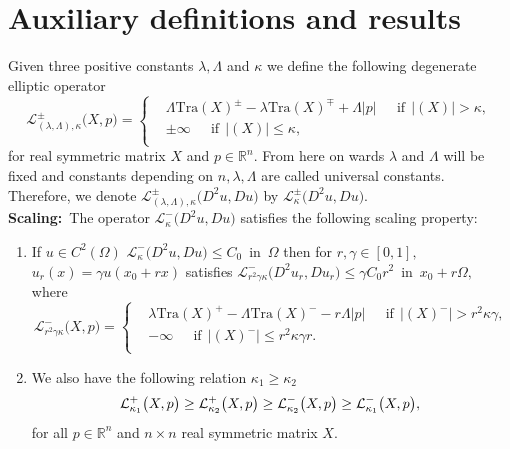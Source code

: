 \documentclass{amsart}
\theoremstyle{plain}
\numberwithin{equation}{section}
\begin{document}
\section{Auxiliary definitions and  results}
Given three positive constants $\lambda,\Lambda$ and $\kappa$ we define the following degenerate elliptic operator
\begin{equation}\label{hoill}
\mathcal{L}_{(\lambda, \Lambda),\kappa}^{\pm}\big(X,p\big)=\left\{
\begin{aligned}
&\Lambda\text{Tra}(X)^{\pm}-\lambda\text{Tra}(X)^{\mp}+\Lambda|p|~~\quad \text{if}~~|(X)|>\kappa,\\ 
&\pm\infty~~\quad \text{if}~~|(X)|\leq \kappa,\\
\end{aligned}
\right.
\end{equation}
for real symmetric matrix $X$ and $p\in \mathbb{R}^{n}.$ From here on wards $\lambda$ and $\Lambda$ will be fixed and constants depending on $n,\lambda,\Lambda$ are called universal constants. Therefore, we denote $\mathcal{L}_{(\lambda, \Lambda),\kappa}^{\pm}\big(D^{2}u,Du\big)$ by $\mathcal{L}_{\kappa}^{\pm}\big(D^{2}u,Du\big).$\\
\textbf{Scaling:}~The operator $\mathcal{L}_{\kappa}^{-}\big(D^{2}u,Du\big)$ satisfies the following scaling property:
\begin{enumerate}
\item{} If $u\in C^{2}(\Omega)$ $\mathcal{L}_{\kappa}^{-}\big(D^{2}u,Du\big)\leq C_{0}$~in~$\Omega$
then for $r,\gamma\in[0,1],$ $u_{r}(x)=\gamma u(x_{0}+rx)$  satisfies $\mathcal{L}_{r^{2}\gamma\kappa}^{-}\big(D^{2}u_{r},Du_{r}\big)\leq \gamma C_{0} r^{2}$~in~$x_{0}+r\Omega,$
where
\begin{equation*}
\mathcal{L}_{r^{2}\gamma\kappa}^{-}\big(X,p\big)=\left\{
\begin{aligned}
&\lambda\text{Tra}(X)^{+}-\Lambda\text{Tra}(X)^{-}-r\Lambda|p|~~\quad \text{if}~~|(X)^{-}|>r^{2}\kappa\gamma,\\ 
&-\infty~~\quad \text{if}~~|(X)^{-}|\leq r^{2}\kappa\gamma r.\\
\end{aligned}
\right.
\end{equation*}
\item{} We also have the following relation $\kappa_{1}\geq \kappa_{2}$
\begin{equation*}\label{order}
\mathcal{L}_{\kappa_{1}}^{+}\big(X,p\big)\geq \mathcal{L}_{\kappa_{2}}^{+}\big(X,p\big)
\geq \mathcal{L}_{\kappa_{2}}^{-}\big(X,p\big)\geq \mathcal{L}_{\kappa_{1}}^{-}\big(X,p\big),\\
\end{equation*}
for all $p\in \mathbb{R}^{n}$ and $n\times n$ real symmetric matrix $X.$
\end{enumerate}
\end{document}
